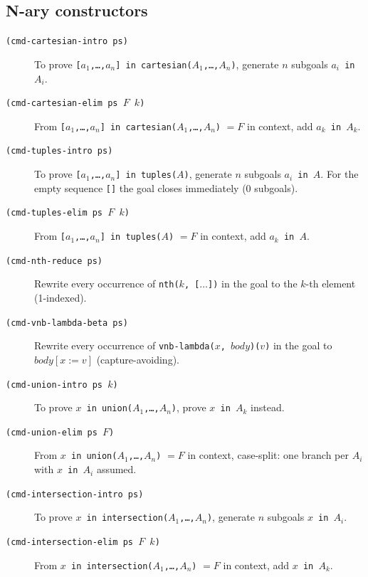 \documentclass{amsbook}[openany]
\theoremstyle{definition}
\theoremstyle{remark}
\theoremstyle{remark}
\begin{document}
\subsection{N-ary constructors}

\begin{description}

\item[\texttt{(cmd-cartesian-intro ps)}]
  To prove \texttt{[$a_1$,\ldots,$a_n$] in cartesian($A_1$,\ldots,$A_n$)},
  generate $n$ subgoals \texttt{$a_i$ in $A_i$}.

\item[\texttt{(cmd-cartesian-elim ps $F$\ $k$)}]
  From \texttt{[$a_1$,\ldots,$a_n$] in cartesian($A_1$,\ldots,$A_n$)} $= F$
  in context, add \texttt{$a_k$ in $A_k$}.

\item[\texttt{(cmd-tuples-intro ps)}]
  To prove \texttt{[$a_1$,\ldots,$a_n$] in tuples($A$)},
  generate $n$ subgoals \texttt{$a_i$ in $A$}.
  For the empty sequence \texttt{[]} the goal closes immediately (0 subgoals).

\item[\texttt{(cmd-tuples-elim ps $F$\ $k$)}]
  From \texttt{[$a_1$,\ldots,$a_n$] in tuples($A$)} $= F$
  in context, add \texttt{$a_k$ in $A$}.

\item[\texttt{(cmd-nth-reduce ps)}]
  Rewrite every occurrence of \texttt{nth($k$, [$\ldots$])} in the goal to
  the $k$-th element (1-indexed).

\item[\texttt{(cmd-vnb-lambda-beta ps)}]
  Rewrite every occurrence of \texttt{vnb-lambda($x$, $\mathit{body}$)($v$)}
  in the goal to $\mathit{body}[x := v]$ (capture-avoiding).

\item[\texttt{(cmd-union-intro ps $k$)}]
  To prove \texttt{$x$ in union($A_1$,\ldots,$A_n$)},
  prove \texttt{$x$ in $A_k$} instead.

\item[\texttt{(cmd-union-elim ps $F$)}]
  From \texttt{$x$ in union($A_1$,\ldots,$A_n$)} $= F$ in context,
  case-split: one branch per $A_i$ with \texttt{$x$ in $A_i$} assumed.

\item[\texttt{(cmd-intersection-intro ps)}]
  To prove \texttt{$x$ in intersection($A_1$,\ldots,$A_n$)},
  generate $n$ subgoals \texttt{$x$ in $A_i$}.

\item[\texttt{(cmd-intersection-elim ps $F$\ $k$)}]
  From \texttt{$x$ in intersection($A_1$,\ldots,$A_n$)} $= F$ in context,
  add \texttt{$x$ in $A_k$}.

\end{description}
\end{document}
